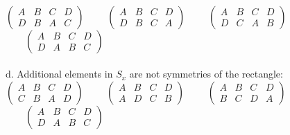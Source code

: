 \\
$\begin{pmatrix}
A & B & C & D\\
D & B & A & C
\end{pmatrix}$
$\qquad\begin{pmatrix}
A & B & C & D\\
D & B & C & A
\end{pmatrix}$
$\qquad\begin{pmatrix}
A & B & C & D\\
D & C & A & B
\end{pmatrix}$
$\qquad\begin{pmatrix}
A & B & C & D\\
D & A & B & C
\end{pmatrix}$\\
\\
d. Additional elements in $S_x$ are not symmetries of the rectangle:\\
$\begin{pmatrix}
A & B & C & D\\
C & B & A & D
\end{pmatrix}$
$\qquad\begin{pmatrix}
A & B & C & D\\
A & D & C & B
\end{pmatrix}$
$\qquad\begin{pmatrix}
A & B & C & D\\
B & C & D & A
\end{pmatrix}$
$\qquad\begin{pmatrix}
A & B & C & D\\
D & A & B & C
\end{pmatrix}$\\
\\

